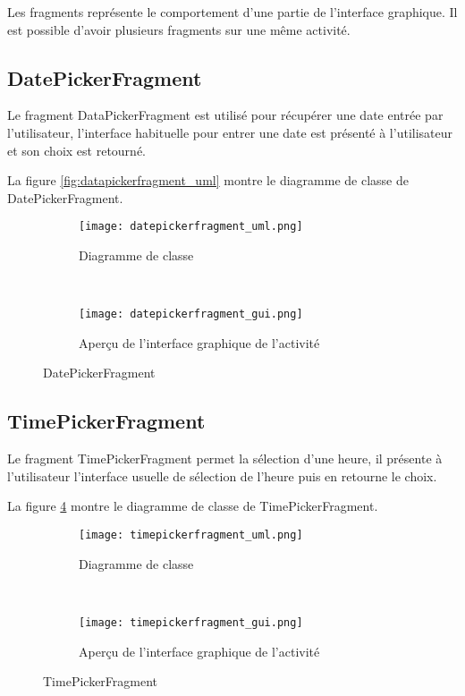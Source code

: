 Les fragments représente le comportement d'une partie de l'interface graphique. Il est possible d'avoir plusieurs fragments sur une même activité.

\subsection{DatePickerFragment}

Le fragment DataPickerFragment est utilisé pour récupérer une date entrée par l'utilisateur, l'interface habituelle pour entrer une date est présenté à l'utilisateur et son choix est retourné.

La figure \ref{fig:datapickerfragment_uml} montre le diagramme de classe de DatePickerFragment.

\begin{figure}[htb!]
    \centering
    \begin{subfigure}[htb]{0.49\textwidth}
		\texttt{[image: datepickerfragment\_uml.png]} 
		\caption{Diagramme de classe}
		\label{fig:datepickerfragment_uml}
    \end{subfigure}
    ~ %
    \begin{subfigure}[htb]{0.49\textwidth}
		\texttt{[image: datepickerfragment\_gui.png]} 
		\caption{Aperçu de l'interface graphique de l'activité}
		\label{fig:datepickerfragment_gui}
    \end{subfigure}
    \caption{DatePickerFragment}\label{fig:datepickerfragment_fig}
\end{figure}

\subsection{TimePickerFragment}

Le fragment TimePickerFragment permet la sélection d'une heure, il présente à l'utilisateur l'interface usuelle de sélection de l'heure puis en retourne le choix.

La figure \ref{fig:timepickerfragment_uml} montre le diagramme de classe de TimePickerFragment.

\begin{figure}[htb!]
    \centering
    \begin{subfigure}[htb]{0.49\textwidth}
		\texttt{[image: timepickerfragment\_uml.png]} 
		\caption{Diagramme de classe}
		\label{fig:timepickerfragment_uml}
    \end{subfigure}
    ~ %
    \begin{subfigure}[htb]{0.49\textwidth}
		\texttt{[image: timepickerfragment\_gui.png]} 
		\caption{Aperçu de l'interface graphique de l'activité}
		\label{fig:timepickerfragment_gui}
    \end{subfigure}
    \caption{TimePickerFragment}\label{fig:timepickerfragment_fig}
\end{figure}

